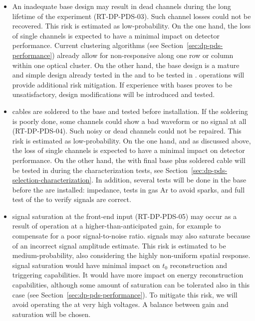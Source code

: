 \begin{itemize}
\item An inadequate  base design may result in dead  channels during the long lifetime of the experiment (RT-DP-PDS-03). Such channel losses could not be recovered. This risk is estimated as low-probability. On the one hand, the loss of single  channels is expected to have a minimal impact on detector performance. Current  clustering algorithms (see Section~\ref{sec:dp-pds-performance}) already allow for non-responsive  along one row or column within one optical cluster. On the other hand, the  base design is a mature and simple design already tested in the  and to be tested in .  operations will provide additional risk mitigation. If  experience with  bases proves to be unsatisfactory, design modifications will be introduced and tested.

\item {} cables are soldered to the  base and tested before installation. If the soldering is poorly done, some channels could show a bad waveform or no signal at all (RT-DP-PDS-04). Such noisy or dead channels could not be repaired. This risk is estimated as low-probability. On the one hand, and as discussed above, the loss of single  channels is expected to have a minimal impact on detector performance. On the other hand, the  with final base plus soldered cable will be tested in \lntwo during the  characterization tests, see Section~\ref{sec:dp-pds-selection-characterization}. In addition, several tests will be done in the base before the  are installed: impedance,  tests in gas Ar to avoid sparks, and full test of the  to verify signals are correct.

\item {} signal saturation at the front-end input (RT-DP-PDS-05) may occur as a result of operation at a higher-than-anticipated  gain, for example to compensate for a poor signal-to-noise ratio.  signals may also saturate because of an incorrect signal amplitude estimate. This risk is estimated to be medium-probability, also considering the highly non-uniform  spatial response.  signal saturation would have minimal impact on  $t_0$ reconstruction and triggering capabilities. It would have more impact on  energy reconstruction capabilities, although some amount of saturation can be tolerated also in this case (see Section~\ref{sec:dp-pds-performance}). To mitigate this risk, we will avoid operating the  at very high voltages. A balance between gain and saturation will be chosen.


\end{itemize}
